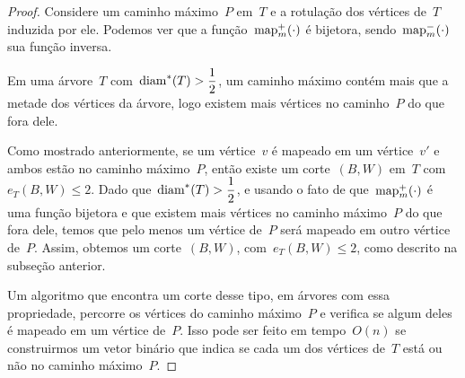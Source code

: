 	\begin{proof}
	Considere um caminho máximo~$P$ em~$T$ e a rotulação dos vértices
	de~$T$ induzida por ele.
	Podemos ver que a função~$\mathrm{map}^+_m(\cdot)$ é bijetora,
	sendo~$\mathrm{map}^-_m(\cdot)$ sua função inversa.

	Em uma árvore~$T$ com~${\mathrm{diam}^*(T)>\dfrac{1}{2}}$,
	um caminho máximo contém mais que a metade dos 
	vértices da árvore, logo
	existem mais 
	vértices no caminho~$P$ do que fora dele. 

	Como mostrado anteriormente, se um vértice~$v$ é mapeado em um
	vértice~$v'$ e ambos estão no caminho máximo~$P$, então existe um
	corte~$(B,W)$ em~$T$ com~${e_T(B,W)\le 2}$.
	Dado que~${\mathrm{diam}^*(T)>\dfrac{1}{2}}$, e usando o fato de 
	que~$\mathrm{map}^+_m(\cdot)$ é uma função bijetora e que
	existem mais vértices no caminho máximo~$P$ do que fora dele,
	temos que pelo menos um vértice de~$P$ será mapeado em
	outro vértice de~$P$. 
	Assim, obtemos um corte~$(B,W)$, com~$e_T(B,W)\le 2$,
	como descrito na subseção anterior.

	Um algoritmo que encontra um corte desse tipo, em árvores com 
	essa propriedade, percorre os vértices do caminho máximo~$P$
	e verifica se algum deles é mapeado em um vértice de~$P$.
	Isso pode ser feito em tempo~$O(n)$ se construirmos um vetor 
	binário que indica se cada um dos vértices de~$T$ está ou não no
	caminho máximo~$P$.
	\end{proof}


	\bigskip
	\bigskip
	\bigskip
	